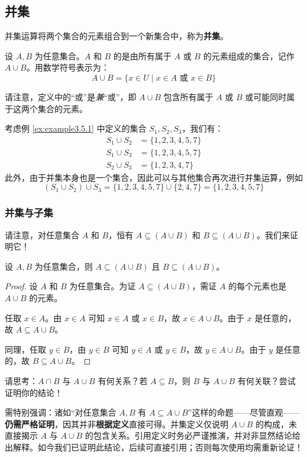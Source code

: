 \subsection{并集}

并集运算将两个集合的元素组合到一个新集合中，称为\textbf{并集}。

\begin{definition}
    设 $A, B$ 为任意集合。$A$ 和 $B$ 的是由所有属于 $A$ 或 $B$ 的元素组成的集合，记作 $A \cup B$。用数学符号表示为：
    \[A \cup B = \{x \in U \mid x \in A \text{\ 或\ } x \in B\}\]
\end{definition}

请注意，定义中的``或''是\emph{兼}``或''，即 $A \cup B$ 包含所有属于 $A$ 或 $B$ 或可能同时属于这两个集合的元素。

\begin{example}
    考虑例 \ref{ex:example3.5.1} 中定义的集合 $S_1, S_2, S_3$，我们有：
    \begin{align*}
        S_1 \cup S_2 &= \{1, 2, 3, 4, 5, 7\} \\
        S_1 \cup S_3 &= \{1, 2, 3, 4, 5, 7\} \\
        S_2 \cup S_3 &= \{1, 2, 3, 4, 7\}
    \end{align*}
    此外，由于并集本身也是一个集合，因此可以与其他集合再次进行并集运算，例如
    \[(S_1 \cup S_2) \cup S_3 = \{1, 2, 3, 4, 5, 7\} \cup  \{2, 4, 7\} =  \{1, 2, 3, 4, 5, 7\}\]
\end{example}

\subsubsection*{并集与子集}

请注意，对任意集合 $A$ 和 $B$，恒有 $A \subseteq (A \cup B)$ 和 $B \subseteq (A \cup B)$。我们来证明它！

\begin{proposition}
    设 $A, B$ 为任意集合，则 $A \subseteq (A \cup B)$ 且 $B \subseteq (A \cup B)$。
\end{proposition}

\begin{proof}
    设 $A$ 和 $B$ 为任意集合。为证 $A \subseteq(A \cup B)$，需证 $A$ 的每个元素也是 $A \cup B$ 的元素。

    任取 $x \in A$。由 $x \in A$ 可知 $x \in A$ 或 $x \in B$，故 $x \in A \cup B$。由于 $x$ 是任意的，故 $A \subseteq A \cup B$。

    同理，任取 $y \in B$，由 $y \in B$ 可知 $y \in A$ 或 $y \in B$，故 $y \in A \cup B$。由于 $y$ 是任意的，故 $B \subseteq A \cup B$。
\end{proof}

请思考：$A \cap B$ 与 $A \cup B$ 有何关系？若 $A \subseteq B$，则 $B$ 与 $A \cup B$ 有何关联？尝试证明你的结论！

需特别强调：诸如``对任意集合 $A, B$ 有 $A \subseteq A \cup B$''这样的命题——尽管直观——\textbf{仍需严格证明}，因其并非\textbf{根据定义}直接可得。并集定义仅说明 $A \cup B$ 的构成，未直接揭示 $A$ 与 $A \cup B$ 的包含关系。引用定义时务必严谨推演，并对非显然结论给出解释。如今我们已证明此结论，后续可直接引用；否则每次使用均需重新论证！
